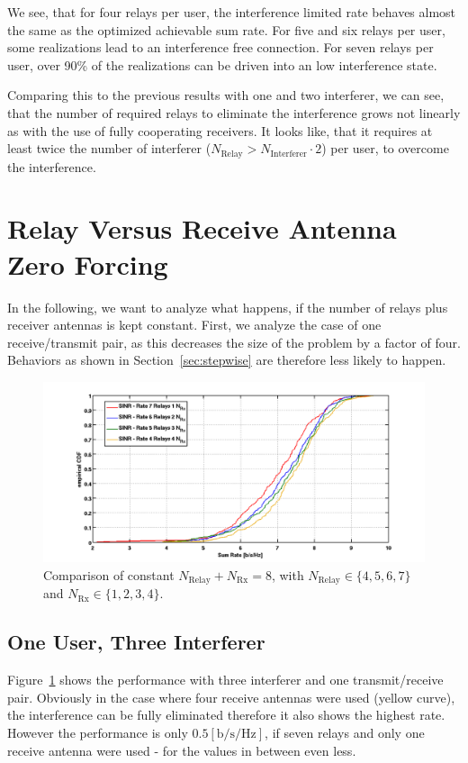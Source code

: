 We see, that for four relays per user, the interference limited rate behaves almost the same as the optimized achievable sum rate.
For five and six relays per user, some realizations lead to an interference free connection.
For seven relays per user, over 90\% of the realizations can be driven into an low interference state.

Comparing this to the previous results with one and two interferer, we can see, that  the number of required relays to eliminate the interference grows not linearly as with the use of fully cooperating receivers.
It looks like, that it requires at least twice the number of interferer ($N_\text{Relay} > N_\text{Interferer}\cdot2$) per user, to overcome the interference.

\section{Relay Versus Receive Antenna Zero Forcing}
\label{sec:rel_rx_comp}

In the following, we want to analyze what happens, if the number of relays plus receiver antennas is kept constant.
First, we analyze the case of one receive/transmit pair, as this decreases the size of the problem by a factor of four.
Behaviors as shown in Section~\ref{sec:stepwise} are therefore less likely to happen.

\begin{figure}[h]
\centering
  \includegraphics[width=0.9\linewidth]{images/ConstNrelNrx8comparison_1Rx_onlySINR.png}
\caption{Comparison of constant $N_\text{Relay} + N_{\text{Rx}} = 8$, with $N_\text{Relay}\in\{4,5,6,7\}$ and $N_{\text{Rx}}\in\{1,2,3,4\}$.}
\label{fig:1user_const}
\end{figure}
\subsection{One User, Three Interferer}
\label{sec:1user_const}
Figure~\ref{fig:1user_const} shows the performance with three interferer and one transmit/receive pair.
Obviously in the case where four receive antennas were used (yellow curve), the interference can be fully eliminated therefore it also shows the highest rate.
However the performance is only $0.5 \left[\text{b/s/Hz}\right]$, if seven relays and only one receive antenna were used - for the values in between even less.

